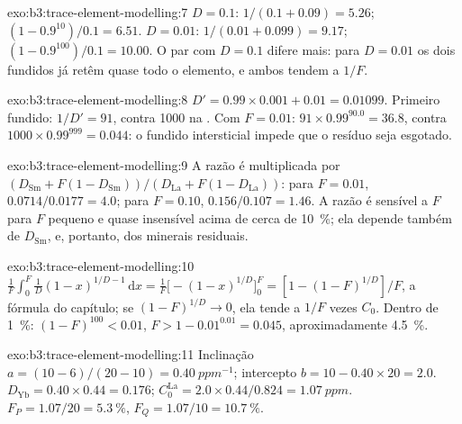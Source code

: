 \begin{solution}{exo:b3:trace-element-modelling:7}
$D = 0.1$:  $1/(0.1 + 0.09) = 5.26$;  $(1 - 0.9^{10})/0.1 =
6.51$. $D = 0.01$:  $1/(0.01 + 0.099) = 9.17$; 
$(1 - 0.9^{100})/0.1 = 10.00$. O par com $D = 0.1$ difere mais: para
$D = 0.01$ os dois fundidos já retêm quase todo o elemento, e ambos tendem a
$1/F$.
\end{solution}

\begin{solution}{exo:b3:trace-element-modelling:8}
$D' = 0.99\times0.001 + 0.01 = 0.01099$. Primeiro fundido: $1/D' = 91$, contra
1000 na . Com $F = 0.01$: $91\times0.99^{90.0} = 36.8$,
contra $1000\times0.99^{999} = 0.044$: o fundido intersticial impede que o resíduo
seja esgotado.
\end{solution}

\begin{solution}{exo:b3:trace-element-modelling:9}
A razão é multiplicada por $(D_{\mathrm{Sm}} + F(1 - D_{\mathrm{Sm}}))/(D_{\mathrm{La}}
+ F(1 - D_{\mathrm{La}}))$: para $F = 0.01$, $0.0714/0.0177 = 4.0$; para $F = 0.10$,
$0.156/0.107 = 1.46$. A razão é sensível a $F$ para $F$ pequeno e quase
insensível acima de cerca de \qty{10}{\percent}; ela depende também de $D_{\mathrm{Sm}}$,
e, portanto, dos minerais residuais.
\end{solution}

\begin{solution}{exo:b3:trace-element-modelling:10}
$\frac1F\int_0^F \frac1D(1 - x)^{1/D - 1}\,\mathrm dx = \frac1F\bigl[-(1 -
x)^{1/D}\bigr]_0^F = [1 - (1 - F)^{1/D}]/F$, a fórmula do capítulo; se
$(1 - F)^{1/D} \to 0$, ela tende a $1/F$ vezes $C_0$. Dentro de \qty{1}{\percent}:
$(1 - F)^{100} < 0.01$, $F > 1 - 0.01^{0.01} = 0.045$, aproximadamente
\qty{4.5}{\percent}.
\end{solution}

\begin{solution}{exo:b3:trace-element-modelling:11}
Inclinação $a = (10 - 6)/(20 - 10) = \qty{0.40}{ppm^{-1}}$; intercepto $b = 10 -
0.40\times20 = 2.0$. $D_{\mathrm{Yb}} = 0.40\times0.44 = 0.176$;
$C_0^{\mathrm{La}} = 2.0\times0.44/0.824 = \qty{1.07}{ppm}$. $F_P = 1.07/20 =
\qty{5.3}{\percent}$, $F_Q = 1.07/10 = \qty{10.7}{\percent}$.
\end{solution}

